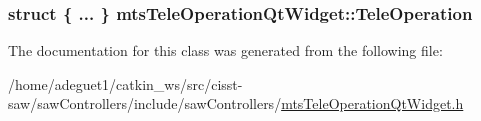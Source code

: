 \hypertarget{classmts_tele_operation_qt_widget_a59ab78038c4a0d93a296516fe7a5562f}{
\subsubsection[{Tele\-Operation}]{\setlength{\rightskip}{0pt plus 5cm}struct \{ ... \}   mts\-Tele\-Operation\-Qt\-Widget\-::\-Tele\-Operation\hspace{0.3cm}{\ttfamily [protected]}}}\label{classmts_tele_operation_qt_widget_a59ab78038c4a0d93a296516fe7a5562f}


The documentation for this class was generated from the following file\-:\begin{DoxyCompactItemize}
\item 
/home/adeguet1/catkin\-\_\-ws/src/cisst-\/saw/saw\-Controllers/include/saw\-Controllers/\hyperlink{mts_tele_operation_qt_widget_8h}{mts\-Tele\-Operation\-Qt\-Widget.\-h}\end{DoxyCompactItemize}
